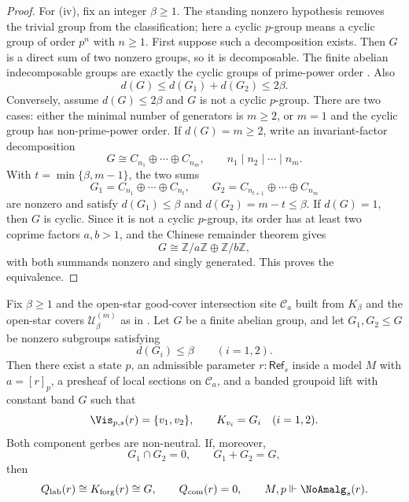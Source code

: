 \begin{proof}
For \textup{(iv)}, fix an integer $\beta\ge1$. The standing nonzero hypothesis removes the trivial group from the classification; here a cyclic $p$-group means a cyclic group of order $p^n$ with $n\ge1$. First suppose such a decomposition exists. Then $G$ is a direct sum of two nonzero groups, so it is decomposable. The finite abelian indecomposable groups are exactly the cyclic groups of prime-power order \cite[Chap.~12]{DummitFoote2004}. Also
\[
d(G)\le d(G_1)+d(G_2)\le 2\beta.
\]
Conversely, assume $d(G)\le2\beta$ and $G$ is not a cyclic $p$-group. There are two cases: either the minimal number of generators is $m\ge2$, or $m=1$ and the cyclic group has non-prime-power order. If $d(G)=m\ge2$, write an invariant-factor decomposition
\[
G\cong C_{n_1}\oplus\cdots\oplus C_{n_m},
\qquad
n_1\mid n_2\mid\cdots\mid n_m.
\]
With $t=\min\{\beta,m-1\}$, the two sums
\[
G_1=C_{n_1}\oplus\cdots\oplus C_{n_t},
\qquad
G_2=C_{n_{t+1}}\oplus\cdots\oplus C_{n_m}
\]
are nonzero and satisfy $d(G_1)\le\beta$ and $d(G_2)=m-t\le\beta$. If $d(G)=1$, then $G$ is cyclic. Since it is not a cyclic $p$-group, its order has at least two coprime factors $a,b>1$, and the Chinese remainder theorem gives
\[
G\cong \mathbb Z/a\mathbb Z\oplus\mathbb Z/b\mathbb Z,
\]
with both summands nonzero and singly generated. This proves the equivalence.
\end{proof}

\begin{lemma}\label{lem:bouquet-mixed-realization-transfer}
Fix $\beta\ge 1$ and the open-star good-cover intersection site $\mathcal C_a$ built from
$K_\beta$ and the open-star covers $\mathcal U_\beta^{(m)}$ as in
. Let $G$ be a finite abelian
group, and let $G_1,G_2\le G$ be nonzero subgroups satisfying
\[
d(G_i)\le \beta\qquad(i=1,2).
\]
Then there exist a state $p$, an admissible parameter $r:\mathsf{Ref}_s$
inside a model $M$ with $a=[r]_p$, a presheaf of local sections on
$\mathcal C_a$, and a banded groupoid lift with constant band $G$ such
that
\[
\Vis_{p,s}(r)=\{v_1,v_2\},
\qquad
K_{v_i}=G_i\quad(i=1,2).
\]
Both component gerbes are non-neutral. If, moreover,
\[
G_1\cap G_2=0,\qquad G_1+G_2=G,
\]
then
\[
Q_{\mathrm{lab}}(r)\cong K_{\mathrm{forg}}(r)\cong G,
\qquad
Q_{\mathrm{com}}(r)=0,
\qquad
M,p\Vdash \NoAmalg_s(r).
\]
\end{lemma}

